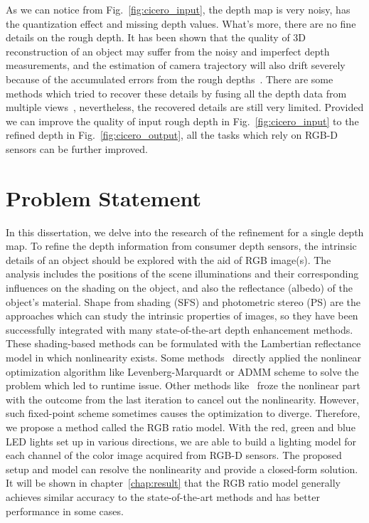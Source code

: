 As we can notice from Fig.~\ref{fig:cicero_input}, the depth map is very noisy, has the quantization effect and missing depth values.
What's more, there are no fine details on the rough depth.
It has been shown that the quality of 3D reconstruction of an object may suffer from the noisy and imperfect depth measurements, and the estimation of camera trajectory will also drift severely because of the accumulated errors from the rough depths~\cite{maier2013thesis}.
There are some methods which tried to recover these details by fusing all the depth data from multiple views~\cite{newcombe2011kinectfusion}, nevertheless, the recovered details are still very limited.
Provided we can improve the quality of input rough depth in Fig.~\ref{fig:cicero_input} to the refined depth in Fig.~\ref{fig:cicero_output}, all the tasks which rely on RGB-D sensors can be further improved. 

\section{Problem Statement}

In this dissertation, we delve into the research of the refinement for a single depth map.
To refine the depth information from consumer depth sensors, the intrinsic details of an object should be explored with the aid of RGB image(s).
The analysis includes the positions of the scene illuminations and their corresponding influences on the shading on the object, and also the reflectance (albedo) of the object's material.
Shape from shading (SFS) and photometric stereo (PS) are the approaches which can study the intrinsic properties of images, so they have been successfully integrated with many state-of-the-art depth enhancement methods.
These shading-based methods can be formulated with the Lambertian reflectance model in which nonlinearity exists. 
Some methods~\cite{wu2014real, or2016real} directly applied the nonlinear optimization algorithm like Levenberg-Marquardt or ADMM scheme to solve the problem which led to runtime issue. 
Other methods like~\cite{or2015rgbd} froze the nonlinear part with the outcome from the last iteration to cancel out the nonlinearity.
However, such fixed-point scheme sometimes causes the optimization to diverge.
Therefore, we propose a method called the RGB ratio model.
With the red, green and blue LED lights set up in various directions, we are able to build a lighting model for each channel of the color image acquired from RGB-D sensors.
The proposed setup and model can resolve the nonlinearity and provide a closed-form solution. 
It will be shown in chapter~\ref{chap:result} that the RGB ratio model generally achieves similar accuracy to the state-of-the-art methods and has better performance in some cases.


